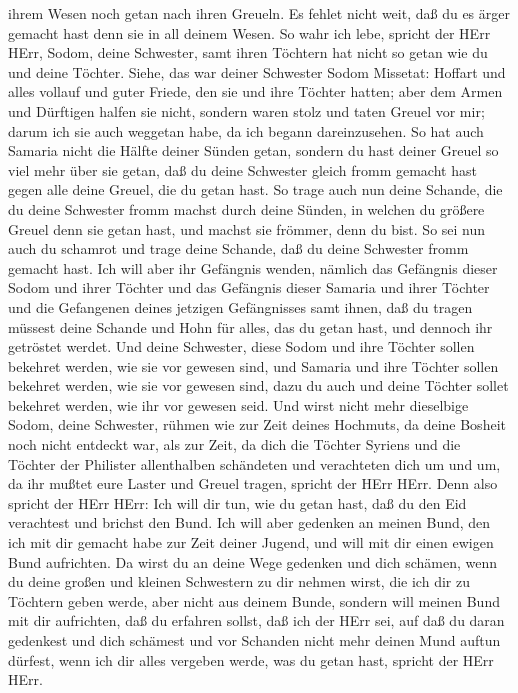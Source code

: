 ihrem Wesen noch getan nach ihren Greueln. Es fehlet nicht weit, daß du
es ärger gemacht hast denn sie in all deinem Wesen.  So
wahr ich lebe, spricht der HErr HErr, Sodom, deine Schwester, samt ihren
Töchtern hat nicht so getan wie du und deine Töchter. 
Siehe, das war deiner Schwester Sodom Missetat: Hoffart und alles
vollauf und guter Friede, den sie und ihre Töchter hatten; aber dem
Armen und Dürftigen halfen sie nicht,  sondern waren stolz
und taten Greuel vor mir; darum ich sie auch weggetan habe, da ich
begann dareinzusehen.  So hat auch Samaria nicht die Hälfte
deiner Sünden getan, sondern du hast deiner Greuel so viel mehr über sie
getan, daß du deine Schwester gleich fromm gemacht hast gegen alle deine
Greuel, die du getan hast.  So trage auch nun deine
Schande, die du deine Schwester fromm machst durch deine Sünden, in
welchen du größere Greuel denn sie getan hast, und machst sie frömmer,
denn du bist. So sei nun auch du schamrot und trage deine Schande, daß
du deine Schwester fromm gemacht hast.  Ich will aber ihr
Gefängnis wenden, nämlich das Gefängnis dieser Sodom und ihrer Töchter
und das Gefängnis dieser Samaria und ihrer Töchter und die Gefangenen
deines jetzigen Gefängnisses samt ihnen,  daß du tragen
müssest deine Schande und Hohn für alles, das du getan hast, und dennoch
ihr getröstet werdet.  Und deine Schwester, diese Sodom und
ihre Töchter sollen bekehret werden, wie sie vor gewesen sind, und
Samaria und ihre Töchter sollen bekehret werden, wie sie vor gewesen
sind, dazu du auch und deine Töchter sollet bekehret werden, wie ihr vor
gewesen seid.  Und wirst nicht mehr dieselbige Sodom, deine
Schwester, rühmen wie zur Zeit deines Hochmuts,  da deine
Bosheit noch nicht entdeckt war, als zur Zeit, da dich die Töchter
Syriens und die Töchter der Philister allenthalben schändeten und
verachteten dich um und um,  da ihr mußtet eure Laster und
Greuel tragen, spricht der HErr HErr.  Denn also spricht
der HErr HErr: Ich will dir tun, wie du getan hast, daß du den Eid
verachtest und brichst den Bund.  Ich will aber gedenken an
meinen Bund, den ich mit dir gemacht habe zur Zeit deiner Jugend, und
will mit dir einen ewigen Bund aufrichten.  Da wirst du an
deine Wege gedenken und dich schämen, wenn du deine großen und kleinen
Schwestern zu dir nehmen wirst, die ich dir zu Töchtern geben werde,
aber nicht aus deinem Bunde,  sondern will meinen Bund mit
dir aufrichten, daß du erfahren sollst, daß ich der HErr sei,
 auf daß du daran gedenkest und dich schämest und vor
Schanden nicht mehr deinen Mund auftun dürfest, wenn ich dir alles
vergeben werde, was du getan hast, spricht der HErr HErr.

